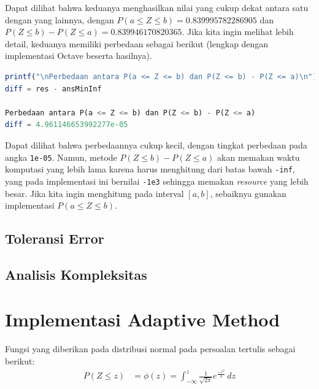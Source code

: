 \documentclass[journal,12pt,onecolumn,a4paper]{IEEEtran}
\begin{document}
Dapat dilihat bahwa keduanya menghasilkan nilai yang cukup dekat antara satu dengan yang lainnya, dengan \(P(a \le Z \le b)= 0.839995782286905\)  dan \(P(Z \le b ) - P(Z \le a ) = 0.839946170820365\). Jika kita ingin melihat lebih detail, keduanya memiliki perbedaan sebagai berikut (lengkap dengan implementasi Octave beserta hasilnya).

\begin{center}
	\begin{lstlisting}[language=Octave]
printf("\nPerbedaan antara P(a <= Z <= b) dan P(Z <= b) - P(Z <= a)\n")
diff = res - ansMinInf

Perbedaan antara P(a <= Z <= b) dan P(Z <= b) - P(Z <= a)
diff = 4.961146653992277e-05
	\end{lstlisting}
\end{center}

Dapat dilihat bahwa perbedaannya cukup kecil, dengan tingkat perbedaan pada angka \lstinline{1e-05}. Namun, metode \(P(Z \le b ) - P(Z \le a )\) akan memakan waktu komputasi yang lebih lama karena harus menghitung dari batas bawah \lstinline{-inf}, yang pada implementasi ini bernilai \lstinline{-1e3} sehingga memakan \emph{resource} yang lebih besar. Jika kita ingin menghitung pada interval \([a,b]\), sebaiknya gunakan implementasi \(P(a \le Z \le b)\).

\subsection{Toleransi Error}


\subsection{Analisis Kompleksitas}

\section{Implementasi Adaptive Method}
\par Fungsi yang diberikan pada distribusi normal pada persoalan tertulis sebagai berikut:
\begin{equation*}
	\begin{split}
		P(Z \le z ) & = \phi(z) = \int_{-\infty}^{z} \frac{1}{\sqrt{2\pi}}e ^{\frac{-z^2}{2}} \,dz
	\end{split}
\end{equation*}
\end{document}
